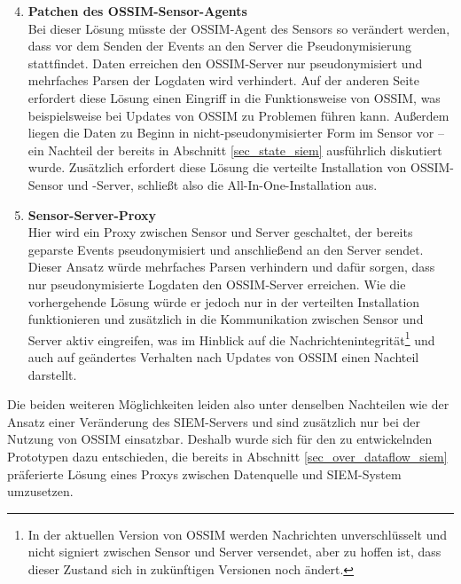 \begin{enumerate}
\setcounter{enumi}{3}

\item \textbf{Patchen des OSSIM-Sensor-Agents}\\
  Bei dieser Lösung müsste der OSSIM-Agent des Sensors so verändert werden, dass vor dem Senden der Events an den Server die Pseudonymisierung stattfindet. Daten erreichen den OSSIM-Server nur pseudonymisiert und mehrfaches Parsen der Logdaten wird verhindert. Auf der anderen Seite erfordert diese Lösung einen Eingriff in die Funktionsweise von OSSIM, was beispielsweise bei Updates von OSSIM zu Problemen führen kann. Außerdem liegen die Daten zu Beginn in nicht-pseudonymisierter Form im Sensor vor -- ein Nachteil der bereits in Abschnitt \ref{sec_state_siem} ausführlich diskutiert wurde. Zusätzlich erfordert diese Lösung die verteilte Installation von OSSIM-Sensor und -Server, schließt also die All-In-One-Installation aus.
  
\item \textbf{Sensor-Server-Proxy}\\
  Hier wird ein Proxy zwischen Sensor und Server geschaltet, der bereits geparste Events pseudonymisiert und anschließend an den Server sendet. Dieser Ansatz würde mehrfaches Parsen verhindern und dafür sorgen, dass nur pseudonymisierte Logdaten den OSSIM-Server erreichen. Wie die vorhergehende Lösung würde er jedoch nur in der verteilten Installation funktionieren und zusätzlich in die Kommunikation zwischen Sensor und Server aktiv eingreifen, was im Hinblick auf die Nachrichtenintegrität\footnote{
    In der aktuellen Version von OSSIM werden Nachrichten unverschlüsselt und nicht signiert zwischen Sensor und Server versendet, aber zu hoffen ist, dass dieser Zustand sich in zukünftigen Versionen noch ändert.
  } und auch auf geändertes Verhalten nach Updates von OSSIM einen Nachteil darstellt.
\end{enumerate}

%

Die beiden weiteren Möglichkeiten leiden also unter denselben Nachteilen wie der Ansatz einer Veränderung des SIEM-Servers und sind zusätzlich nur bei der Nutzung von OSSIM einsatzbar.
Deshalb wurde sich für den zu entwickelnden Prototypen dazu entschieden, die bereits in Abschnitt \ref{sec_over_dataflow_siem} präferierte Lösung eines Proxys zwischen Datenquelle und SIEM-System umzusetzen.

